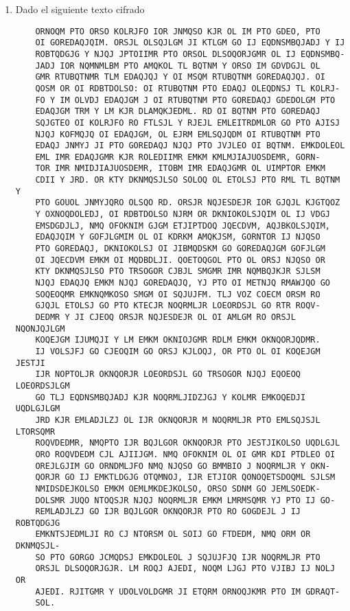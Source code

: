 \documentclass[letterpaper,11pt]{article}
\begin{document}
\begin{enumerate}
    \item Dado el siguiente texto cifrado
    \begin{verbatim}
    ORNOQM PTO ORSO KOLRJFO IOR JNMQSO KJR OL IM PTO GDEO, PTO
    OI GOREDAQJQIM. ORSJL OLSQJLGM JI KTLGM GO IJ EQDNSMBQJADJ Y IJ
    ROBTQDGJG Y NJQJ JPTOIIMR PTO ORSOL DLSOQORJGMR OL IJ EQDNSMBQ-
    JADJ IOR NQMNMLBM PTO AMQKOL TL BQTNM Y ORSO IM GDVDGJL OL
    GMR RTUBQTNMR TLM EDAQJQJ Y OI MSQM RTUBQTNM GOREDAQJQJ. OI
    QOSM OR OI RDBTDOLSO: OI RTUBQTNM PTO EDAQJ OLEQDNSJ TL KOLRJ-
    FO Y IM OLVDJ EDAQJGM J OI RTUBQTNM PTO GOREDAQJ GDEDOLGM PTO
    EDAQJGM TRM Y LM KJR DLAMQKJEDML. RD OI BQTNM PTO GOREDAQJ
    SQJGTEO OI KOLRJFO RO FTLSJL Y RJEJL EMLEITRDMLOR GO PTO AJISJ
    NJQJ KOFMQJQ OI EDAQJGM, OL EJRM EMLSQJQDM OI RTUBQTNM PTO
    EDAQJ JNMYJ JI PTO GOREDAQJ NJQJ PTO JVJLEO OI BQTNM. EMKDOLEOL
    EML IMR EDAQJGMR KJR ROLEDIIMR EMKM KMLMJIAJUOSDEMR, GORN-
    TOR IMR NMIDJIAJUOSDEMR, ITOBM IMR EDAQJGMR OL UIMPTOR EMKM
    CDII Y JRD. OR KTY DKNMQSJLSO SOLOQ OL ETOLSJ PTO RML TL BQTNM Y
    PTO GOUOL JNMYJQRO OLSQO RD. ORSJR NQJESDEJR IOR GJQJL KJGTQOZ
    Y OXNOQDOLEDJ, OI RDBTDOLSO NJRM OR DKNIOKOLSJQIM OL IJ VDGJ
    EMSDGDJLJ, NMQ OFOKNIM GJGM ETJIPTDOQ JQECDVM, AQJBKOLSJQIM,
    EDAQJQIM Y GOFJLGMIM OL OI KDRKM AMQKJSM, GORNTOR IJ NJQSO
    PTO GOREDAQJ, DKNIOKOLSJ OI JIBMQDSKM GO GOREDAQJGM GOFJLGM
    OI JQECDVM EMKM OI MQDBDLJI. QOETOQGOL PTO OL ORSJ NJQSO OR
    KTY DKNMQSJLSO PTO TRSOGOR CJBJL SMGMR IMR NQMBQJKJR SJLSM
    NJQJ EDAQJQ EMKM NJQJ GOREDAQJQ, YJ PTO OI METNJQ RMAWJQO GO
    SOQEOQMR EMKNQMKOSO SMGM OI SQJUJFM. TLJ VOZ COECM ORSM RO
    GJQJL ETOLSJ GO PTO KTECJR NOQRMLJR LOEORDSJL GO RTR ROQV-
    DEDMR Y JI CJEOQ ORSJR NQJESDEJR OL OI AMLGM RO ORSJL NQONJQJLGM
    KOQEJGM IJUMQJI Y LM EMKM OKNIOJGMR RDLM EMKM OKNQORJQDMR.
    IJ VOLSJFJ GO CJEOQIM GO ORSJ KJLOQJ, OR PTO OL OI KOQEJGM JESTJI
    IJR NOPTOLJR OKNQORJR LOEORDSJL GO TRSOGOR NJQJ EQOEOQ LOEORDSJLGM
    GO TLJ EQDNSMBQJADJ KJR NOQRMLJIDZJGJ Y KOLMR EMKOQEDJI UQDLGJLGM
    JRD KJR EMLADJLZJ OL IJR OKNQORJR M NOQRMLJR PTO EMLSQJSJL LTORSQMR
    ROQVDEDMR, NMQPTO IJR BQJLGOR OKNQORJR PTO JESTJIKOLSO UQDLGJL
    ORO ROQVDEDM CJL AJIIJGM. NMQ OFOKNIM OL OI GMR KDI PTDLEO OI
    OREJLGJIM GO ORNDMLJFO NMQ NJQSO GO BMMBIO J NOQRMLJR Y OKN-
    QORJR GO IJ EMKTLDGJG OTQMNOJ, IJR ETJIOR QONOQETSDOQML SJLSM
    NMIDSDEJKOLSO EMKM OEMLMKDEJKOLSO, ORSO SDNM GO JEMLSOEDK-
    DOLSMR JUQO NTOQSJR NJQJ NOQRMLJR EMKM LMRMSQMR YJ PTO IJ GO-
    REMLADJLZJ GO IJR BQJLGOR OKNQORJR PTO RO GOGDEJL J IJ ROBTQDGJG
    EMKNTSJEDMLJI RO CJ NTORSM OL SOIJ GO FTDEDM, NMQ ORM OR DKNMQSJL-
    SO PTO GORGO JCMQDSJ EMKDOLEOL J SQJUJFJQ IJR NOQRMLJR PTO
    ORSJL DLSOQORJGJR. LM ROQJ AJEDI, NOQM LJGJ PTO VJIBJ IJ NOLJ OR
    AJEDI. RJITGMR Y UDOLVOLDGMR JI ETQRM ORNOQJKMR PTO IM GDRAQT-
    SOL.
    \end{verbatim}
    

\end{enumerate}
\end{document}
